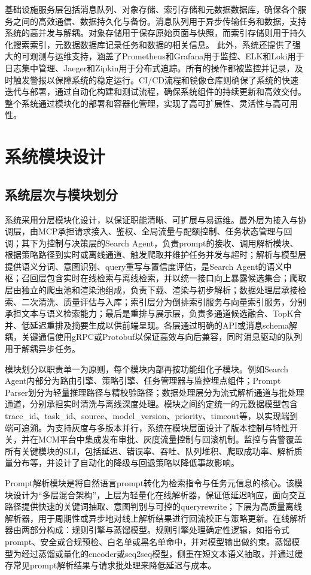 基础设施服务层包括消息队列、对象存储、索引存储和元数据数据库，确保各个服务之间的高效通信、数据持久化与备份。消息队列用于异步传输任务和数据，支持系统的高并发与解耦。对象存储用于保存原始页面与快照，而索引存储则用于持久化搜索索引，元数据数据库记录任务和数据的相关信息。
此外，系统还提供了强大的可观测与运维支持，涵盖了Prometheus和Grafana用于监控、ELK和Loki用于日志集中管理、Jaeger和Zipkin用于分布式追踪。所有的操作都被监控并记录，及时触发警报以保障系统的稳定运行。CI/CD流程和镜像仓库则确保了系统的快速迭代与部署，通过自动化构建和测试流程，确保系统组件的持续更新和高效交付。整个系统通过模块化的部署和容器化管理，实现了高可扩展性、灵活性与高可用性。

\section{系统模块设计}
\subsection{系统层次与模块划分}
系统采用分层模块化设计，以保证职能清晰、可扩展与易运维。最外层为接入与协调层，由MCP承担请求接入、鉴权、全局流量与配额控制、任务状态管理与回调；其下为控制与决策层的Search Agent，负责prompt的接收、调用解析模块、根据策略路径到实时或离线通道、触发爬取并维护任务并发与超时；解析与模型层提供语义分词、意图识别、query重写与置信度评估，是Search Agent的语义中枢；召回层包含实时在线检索与离线检索，并以统一接口向上暴露候选集合；爬取层由独立的爬虫池和渲染池组成，负责下载、渲染与初步解析；数据处理层承接检索、二次清洗、质量评估与入库；索引层分为倒排索引服务与向量索引服务，分别承担文本与语义检索能力；最后是重排与展示层，负责多通道候选融合、TopK合并、低延迟重排及摘要生成以供前端呈现。各层通过明确的API或消息schema解耦，关键通信使用gRPC或Protobuf以保证高效与向后兼容，同时消息驱动的队列用于解耦异步任务。

模块划分以职责单一为原则，每个模块内部再按功能细化子模块。例如Search Agent内部分为路由引擎、策略引擎、任务管理器与监控埋点组件；Prompt Parser划分为轻量推理路径与精校验路径；数据处理层分为流式解析通道与批处理通道，分别承担实时清洗与离线深度处理。模块之间约定统一的元数据模型包含trace\_id、task\_id、source、model\_version、priority、timeout等，以实现端到端可追溯。为支持灰度与多版本并行，系统在模块层面设计了版本控制与特性开关，并在MCM平台中集成发布审批、灰度流量控制与回滚机制。监控与告警覆盖所有关键模块的SLI，包括延迟、错误率、吞吐、队列堆积、爬取成功率、解析质量分布等，并设计了自动化的降级与回退策略以降低事故影响。

Prompt解析模块是将自然语言prompt转化为检索指令与任务元信息的核心。该模块设计为“多层混合架构”，上层为轻量化在线解析器，保证低延迟响应，面向交互路径提供快速的关键词抽取、意图判别与可控的queryrewrite；下层为高质量离线解析器，用于周期性或异步地对线上解析结果进行回流校正与策略更新。在线解析器由两部分构成：规则引擎与蒸馏模型。规则引擎处理确定性逻辑，如指令式prompt、安全或合规预检、白名单或黑名单命中，并对模型输出做约束。蒸馏模型为经过蒸馏或量化的encoder或seq2seq模型，侧重在短文本语义抽取，并通过缓存常见prompt解析结果与请求批处理来降低延迟与成本。
